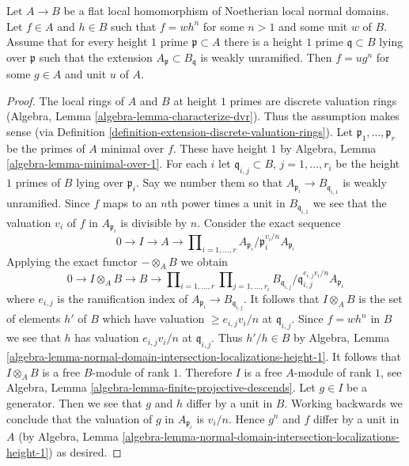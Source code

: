 \begin{lemma}
\label{lemma-extension-normal-domains-and-roots}
Let $A \to B$ be a flat local homomorphism of Noetherian local normal domains.
Let $f \in A$ and $h \in B$ such that $f = w h^n$ for some $n > 1$ and some
unit $w$ of $B$. Assume that for every height $1$ prime
$\mathfrak p \subset A$ there is a height $1$ prime
$\mathfrak q \subset B$ lying over $\mathfrak p$
such that the extension $A_\mathfrak p \subset B_\mathfrak q$ is
weakly unramified. Then $f = u g^n$ for some $g \in A$ and unit $u$ of $A$.
\end{lemma}

\begin{proof}
The local rings of $A$ and $B$ at height $1$ primes are
discrete valuation rings (Algebra, Lemma \ref{algebra-lemma-characterize-dvr}).
Thus the assumption makes sense (via
Definition \ref{definition-extension-discrete-valuation-rings}).
Let $\mathfrak p_1, \ldots, \mathfrak p_r$ be the primes of $A$ minimal
over $f$. These have height $1$ by
Algebra, Lemma \ref{algebra-lemma-minimal-over-1}.
For each $i$ let $\mathfrak q_{i, j} \subset B$, $j = 1, \ldots, r_i$
be the height $1$ primes of $B$ lying over $\mathfrak p_i$.
Say we number them so that  $A_{\mathfrak p_i} \to B_{\mathfrak q_{i, 1}}$
is weakly unramified.
Since $f$ maps to an $n$th power times a unit in $B_{\mathfrak q_{i, 1}}$
we see that the valuation $v_i$ of $f$ in $A_{\mathfrak p_i}$ is
divisible by $n$. Consider the exact sequence
$$
0 \to I \to A \to
\prod\nolimits_{i = 1, \ldots, r}
A_{\mathfrak p_i}/\mathfrak p_i^{v_i/n}A_{\mathfrak p_i}
$$
Applying the exact functor $- \otimes_A B$ we obtain
$$
0 \to I \otimes_A B \to B \to
\prod\nolimits_{i = 1, \ldots, r}
\prod\nolimits_{j = 1, \ldots, r_i}
B_{\mathfrak q_{i, j}}/\mathfrak q_{i, j}^{e_{i, j}v_i/n}A_{\mathfrak p_i}
$$
where $e_{i, j}$ is the ramification index of 
$A_{\mathfrak p_i} \to B_{\mathfrak q_{i, j}}$.
It follows that $I \otimes_A B$ is the set of elements $h'$ of $B$
which have valuation $\geq e_{i, j}v_i/n$ at $\mathfrak q_{i, j}$.
Since $f = wh^n$ in $B$ we see that $h$ has valuation
$e_{i, j}v_i/n$ at $\mathfrak q_{i, j}$. Thus $h'/h \in B$
by Algebra, Lemma
\ref{algebra-lemma-normal-domain-intersection-localizations-height-1}.
It follows that $I \otimes_A B$ is a free $B$-module of rank $1$.
Therefore $I$ is a free $A$-module of rank $1$, see
Algebra, Lemma \ref{algebra-lemma-finite-projective-descends}.
Let $g \in I$ be a generator. Then we see that
$g$ and $h$ differ by a unit in $B$. Working backwards we
conclude that the valuation of $g$ in $A_{\mathfrak p_i}$ is
$v_i/n$. Hence $g^n$ and $f$ differ by a unit in $A$
(by Algebra, Lemma
\ref{algebra-lemma-normal-domain-intersection-localizations-height-1})
as desired.
\end{proof}

